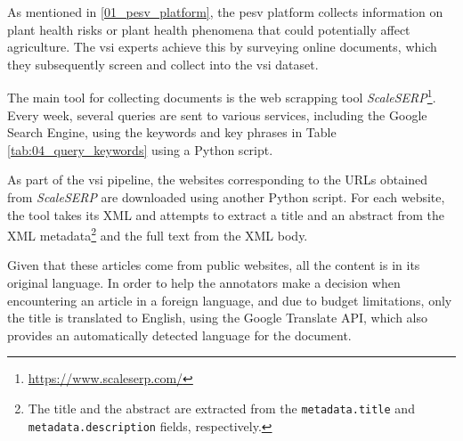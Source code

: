 \label{vsi_dataset}

As mentioned in \headerName{} \ref{01_pesv_platform}, the \gls{pesv} platform collects information on  plant health risks or plant health phenomena that could potentially affect agriculture. The \gls{vsi} experts achieve this by surveying online documents, which they subsequently screen and collect into the \gls{vsi} dataset.
\label{vsi_data_collection}

The main tool for collecting documents is the web scrapping tool \emph{ScaleSERP}\footnote{\url{https://www.scaleserp.com/}}. Every week, several queries are sent to various services, including the Google Search Engine, using the keywords and key phrases in Table \ref{tab:04_query_keywords} using a Python script. 


As part of the \gls{vsi} pipeline, the websites corresponding to the URLs obtained from \emph{ScaleSERP} are downloaded using another Python script. 
For each website, the tool \trafilatura{}  takes its XML and attempts to extract a title and  an abstract from the XML metadata\footnote{The title and the abstract are extracted from the \texttt{metadata.title} and \texttt{metadata.description} fields, respectively.} and the full text from the XML body.

Given that these articles come from public websites, all the content is in its original language.
In order to help the annotators make a decision when encountering an article in a foreign language, and due to budget limitations, only the title is translated to English, using the Google Translate API, which also provides an automatically detected language for the document. 

